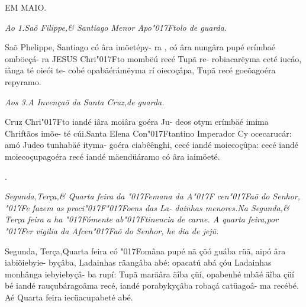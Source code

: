 \documentclass[openany,titlepage,12pt]{book}
\newcommand{\lgS}{\char"017F}
\newcommand{\lgSS}{\char"017F\char"017F}
\begin{document}
\vspace*{4pt}
\begin{center}
    {EM MAIO.\\}
\end{center}
\begin{center}
    \textit{\small Ao 1.Saõ Filippe,\& Santiago Menor Apo\lgS tolo
    de guarda.}
\end{center}

\vspace*{4pt}
{\hspace*{-2ex}Saõ Phelippe, Santiago có âra imöetépy-
ra , có âra nungâra pupé erímbaé omböeçá-
ra JESUS Chri\lgS to  mombëú recé Tupã re-
robiacarëyma ceté iucáo, ïânga té oieói te-
cobé opabäérámëyma rí oiecoçâpa, Tupã
recé goeõagoéra repyramo.}

\begin{center}
    \textit{\small Aos 3.A Invençaõ da Santa Cruz,de guarda.}
\end{center}


{\hspace*{-2ex}Cruz Chri\lgS to  iandé iâra moiâra goéra Ju-
deos otym erímbäé imima Chriftãos imõe-
té cúi.Santa Elena Con\lgS tantino Imperador
Cy ocecarucár: amó Judeo tunhabäé ityma-
goéra ciabêênghi, cecé iandé moiecoçûpa:
cecé iandé moiecoçupagoéra recé iandé\linebreak
mäendüáramo có âra iaimöeté.\\}


\hspace*{-5ex}\begin{minipage}[t]{1ex}
.
\end{minipage}
\hspace*{1ex}\begin{minipage}[t]{0.96\linewidth}
    \textit{
    \footnotesize \hspace*{-3ex}Segunda,Terça,\& Quarta feira da \lgS emana da A\lgS 
    cen\lgS aõ do Senhor, \lgS e fazem as proci\lgSS oens das La-
    dainhas menores.Na Segunda,\& Terça feira a ha
    \lgS ómente ab\lgS tinencia de carne. A quarta feira,por
    \lgS er vigilia da Afcen\lgS aõ do Senhor, he dia de jej\~u.}
    \newline\vspace*{4pt}
\end{minipage}


{\hspace*{-2ex}Segunda, Terça,Quarta feira có \lgS omâna
pupé nã çöó guába rüã, aipó âra iabiõiebyie-
byçâba, Ladainhas räangâba abé: opacatú
abá çóu Ladainhas monhânga iebyiebyçâ-
ba rupí: Tupã maräâra äîba çüí, opabenhé
mbäé äîba çüí bé iandé rauçubáragoâma\linebreak
recé, iandé porabykyçâba robaçá catüagoâ-
ma recébé. Aé Quarta feira iecüacupabeté
abé.}
\end{document}
